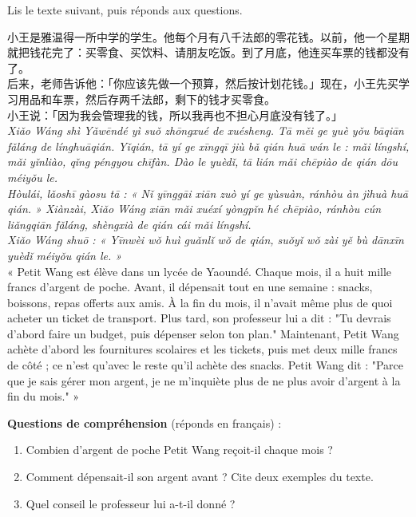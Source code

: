 \documentclass[11pt]{article}
\newcounter{popsec}
\newcounter{popsub}
\newcommand{\courssub}[1]{%
  \stepcounter{popsub}%
  \par\vspace{9pt}\noindent{\popxbold\fontsize{11.5}{13}\selectfont\color{popink}{\color{poporange}\thepopsec.\thepopsub}\hspace{6pt}#1}\par\nopagebreak\vspace{4pt}
}
\begin{document}
\courssub{Je me prépare au Bac}

\begin{exercice}
Lis le texte suivant, puis réponds aux questions.
\begin{textebox}
小王是雅温得一所中学的学生。他每个月有八千法郎的零花钱。以前，他一个星期就把钱花完了：买零食、买饮料、请朋友吃饭。到了月底，他连买车票的钱都没有了。\\
后来，老师告诉他：「你应该先做一个预算，然后按计划花钱。」现在，小王先买学习用品和车票，然后存两千法郎，剩下的钱才买零食。\\
小王说：「因为我会管理我的钱，所以我再也不担心月底没有钱了。」\\
\emph{Xiǎo Wáng shì Yǎwēndé yì suǒ zhōngxué de xuésheng. Tā měi ge yuè yǒu bāqiān fǎláng de línghuāqián. Yǐqián, tā yí ge xīngqī jiù bǎ qián huā wán le : mǎi língshí, mǎi yǐnliào, qǐng péngyou chīfàn. Dào le yuèdǐ, tā lián mǎi chēpiào de qián dōu méiyǒu le.}\\
\emph{Hòulái, lǎoshī gàosu tā : « Nǐ yīnggāi xiān zuò yí ge yùsuàn, ránhòu àn jìhuà huā qián. » Xiànzài, Xiǎo Wáng xiān mǎi xuéxí yòngpǐn hé chēpiào, ránhòu cún liǎngqiān fǎláng, shèngxià de qián cái mǎi língshí.}\\
\emph{Xiǎo Wáng shuō : « Yīnwèi wǒ huì guǎnlǐ wǒ de qián, suǒyǐ wǒ zài yě bù dānxīn yuèdǐ méiyǒu qián le. »}\\
« Petit Wang est élève dans un lycée de Yaoundé. Chaque mois, il a huit mille francs d'argent de poche. Avant, il dépensait tout en une semaine : snacks, boissons, repas offerts aux amis. À la fin du mois, il n'avait même plus de quoi acheter un ticket de transport. Plus tard, son professeur lui a dit : "Tu devrais d'abord faire un budget, puis dépenser selon ton plan." Maintenant, Petit Wang achète d'abord les fournitures scolaires et les tickets, puis met deux mille francs de côté ; ce n'est qu'avec le reste qu'il achète des snacks. Petit Wang dit : "Parce que je sais gérer mon argent, je ne m'inquiète plus de ne plus avoir d'argent à la fin du mois." »
\end{textebox}
\textbf{Questions de compréhension} (réponds en français) :
\begin{enumerate}
\item Combien d'argent de poche Petit Wang reçoit-il chaque mois ?
\item Comment dépensait-il son argent avant ? Cite deux exemples du texte.
\item Quel conseil le professeur lui a-t-il donné ?

\end{enumerate}
\end{exercice}
\end{document}
